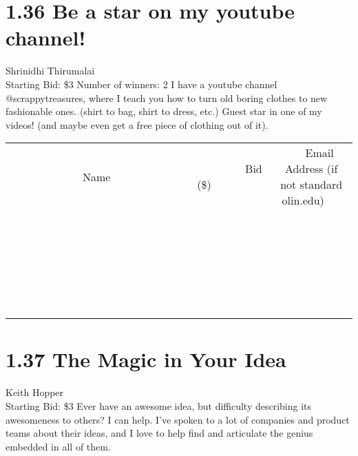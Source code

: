 \documentclass[11pt]{article}
\begin{document}
\section*{1.36 Be a star on my youtube channel!}
Shrinidhi Thirumalai
\\
Starting Bid: \$3
\newline
Number of winners: 2
\newline
I have a youtube channel @scrappytreasures, where I teach you how to turn old boring clothes to new fashionable ones. (shirt to bag, shirt to dress, etc.) Guest star in one of my videos! (and maybe even get a free piece of clothing out of it).
\\[6ex]
\begin{tabular}{c c c}
~~~~~~~~~~~~~Name~~~~~~~~~~~~~ & ~~~~~~~~~Bid (\$)~~~~~~~~~  & ~~~Email Address (if not standard olin.edu)~~~\\
 & & \\
\hline
 & & \\
\hline
 & & \\
\hline
 & & \\
\hline
 & & \\
\hline
 & & \\
\hline
 & & \\
\hline
 & & \\
\hline
 & & \\
\hline
 & & \\
\hline
 & & \\
\hline
 & & \\
\hline
 & & \\
\hline
 & & \\
\hline
 & & \\
\hline
 & & \\
\hline
 & & \\
\hline
 & & \\
\hline
 & & \\
\hline
 & & \\
\hline
 & & \\
\hline
 & & \\
\hline
 & & \\
\hline
 & & \\
\hline
 & & \\
\hline
 & & \\
\hline
\end{tabular}
\newpage
\section*{1.37 The Magic in Your Idea}
Keith Hopper
\\
Starting Bid: \$3
\newline
Ever have an awesome idea, but difficulty describing its awesomeness to others? I can help. I've spoken to a lot of companies and product teams about their ideas, and I love to help find and articulate the genius embedded in all of them.
\end{document}
